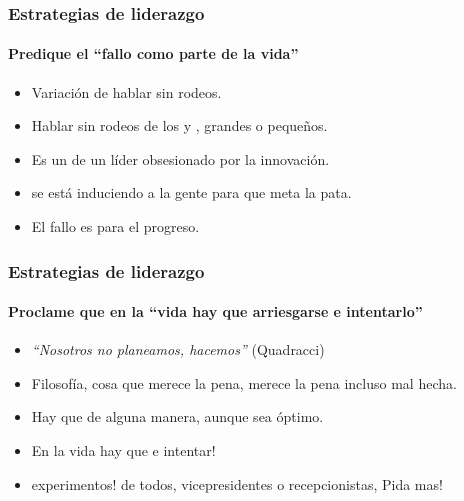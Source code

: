 \frame
{
\frametitle{Estrategias de liderazgo}
\framesubtitle{Predique el ``fallo como parte de la vida''}
\begin{itemize}
	\item Variación de hablar sin rodeos.
	\item Hablar sin rodeos de los  y , grandes o pequeños.
	\item Es un  de un líder obsesionado por la innovación.
	\item {} se está induciendo a la gente para que meta la pata.
	\item El fallo es  para el progreso.
\end{itemize}
}

\frame
{
\frametitle{Estrategias de liderazgo}
\framesubtitle{Proclame que en la ``vida hay que arriesgarse e intentarlo''}
\begin{itemize}
	\item \emph{``Nosotros no planeamos, hacemos''} (Quadracci)
	\item Filosofía,  cosa que merece la pena, merece la pena incluso mal hecha.
	\item Hay que  de alguna manera, aunque  sea óptimo.
	\item En la vida hay que  e intentar!
	\item {} experimentos! de todos, vicepresidentes o recepcionistas, Pida mas!
\end{itemize}
}
